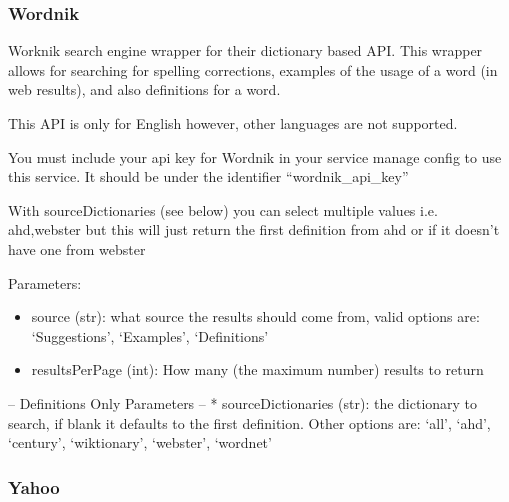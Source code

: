 \documentclass[letterpaper,10pt,english]{sphinxmanual}
\begin{document}
\subsubsection{Wordnik}
\label{api3.0:wordnik}

\begin{fulllineitems}
\label{api3.0:puppy.search.engine.Wordnik}
Worknik search engine wrapper for their dictionary based API. This wrapper allows for searching for spelling corrections, examples of the usage of a word (in web results),
and also definitions for a word.

This API is only for English however, other languages are not supported.

You must include your api key for Wordnik in your service manage config to use this service. It should be under the identifier ``wordnik\_api\_key''

With sourceDictionaries (see below) you can select multiple values i.e. ahd,webster but this will just return the first definition from ahd or if it doesn't have one from webster

Parameters:
\begin{itemize}
\item {} 
source (str): what source the results should come from, valid options are: `Suggestions', `Examples', `Definitions'

\item {} 
resultsPerPage (int): How many (the maximum number) results to return

\end{itemize}

-- Definitions Only Parameters --
* sourceDictionaries (str): the dictionary to search, if blank it defaults to the first definition. Other options are: `all', `ahd', `century', `wiktionary', `webster', `wordnet'

\end{fulllineitems}



\subsubsection{Yahoo}
\label{api3.0:yahoo}
\end{document}

